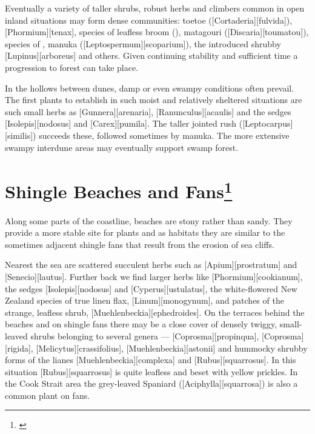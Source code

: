 Eventually a variety of taller shrubs, robust herbs and climbers common in open inland situations may form dense communities: toetoe ([Cortaderia][fulvida]),  [Phormium][tenax], species of leafless broom (), matagouri ([Discaria][toumatou]), species of , manuka ([Leptospermum][scoparium]), the introduced shrubby [Lupinus][arboreus] and others.
Given continuing stability and sufficient time a progression to forest can take place.

In the hollows between dunes, damp or even swampy conditions often prevail.
The first plants to establish in such moist and relatively sheltered situations are such small herbs as [Gunnera][arenaria], [Ranunculus][acaulis] and the sedges [Isolepis][nodosus] and [Carex][pumila].
The taller jointed rush ([Leptocarpus][similis]) succeeds these, followed sometimes by manuka.
The more extensive swampy interdune areas may eventually support swamp forest.

\section[Shingle Beaches and Fans]{Shingle Beaches and Fans\footnote{\cite{moore1963plants}}}

Along some parts of the coastline, beaches are stony rather than sandy.
They provide a more stable site for plants and as habitats they are similar to the sometimes adjacent shingle fans that result from the erosion of sea cliffs.

Nearest the sea are scattered succulent herbs such as [Apium][prostratum] and [Senecio][lautus].
Further back we find larger herbs like [Phormium][cookianum], the sedges [Isolepis][nodosus] and [Cyperus][ustulatus], the white-flowered New Zealand species of true linen flax, [Linum][monogynum], and patches of the strange, leafless shrub, [Muehlenbeckia][ephedroides].
On the terraces behind the beaches and on shingle fans there may be a close cover of densely twiggy, small-leaved shrubs belonging to several genera --- [Coprosma][propinqua], [Coprosma][rigida],  [Melicytus][crassifolius],  [Muehlenbeckia][astonii] and hummocky shrubby forms of the lianes [Muehlenbeckia][complexa] and [Rubus][squarrosus].
In this situation [Rubus][squarrosus] is quite leafless and beset with yellow prickles.
In the Cook Strait area the grey-leaved Spaniard ([Aciphylla][squarrosa]) is also a common plant on fans.


